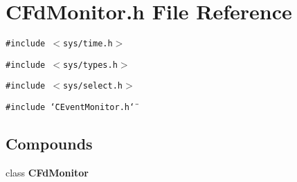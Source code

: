\section{CFd\-Monitor.h File Reference}
\label{CFdMonitor_8h}
{\tt \#include $<$sys/time.h$>$}\par
{\tt \#include $<$sys/types.h$>$}\par
{\tt \#include $<$sys/select.h$>$}\par
{\tt \#include \char`\"{}CEvent\-Monitor.h\char`\"{}}\par
\subsection*{Compounds}
\begin{CompactItemize}
\item 
class {\bf CFd\-Monitor}
\end{CompactItemize}
